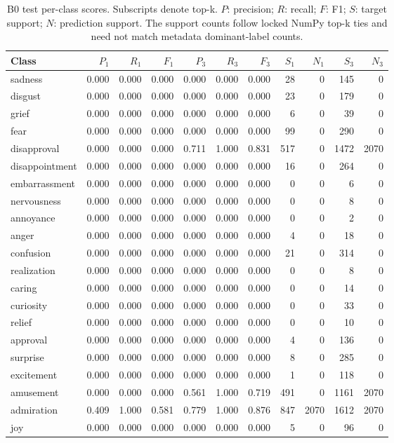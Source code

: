\begin{table}[!htbp]
\centering
\scriptsize
\setlength{\tabcolsep}{5pt}
\begin{tabular}{lrrrrrrrrrr}
\toprule
Class & $P_1$ & $R_1$ & $F_1$ & $P_3$ & $R_3$ & $F_3$ & $S_1$ & $N_1$ & $S_3$ & $N_3$ \\
\midrule
sadness & 0.000 & 0.000 & 0.000 & 0.000 & 0.000 & 0.000 & 28 & 0 & 145 & 0 \\
disgust & 0.000 & 0.000 & 0.000 & 0.000 & 0.000 & 0.000 & 23 & 0 & 179 & 0 \\
grief & 0.000 & 0.000 & 0.000 & 0.000 & 0.000 & 0.000 & 6 & 0 & 39 & 0 \\
fear & 0.000 & 0.000 & 0.000 & 0.000 & 0.000 & 0.000 & 99 & 0 & 290 & 0 \\
disapproval & 0.000 & 0.000 & 0.000 & 0.711 & 1.000 & 0.831 & 517 & 0 & 1472 & 2070 \\
disappointment & 0.000 & 0.000 & 0.000 & 0.000 & 0.000 & 0.000 & 16 & 0 & 264 & 0 \\
embarrassment & 0.000 & 0.000 & 0.000 & 0.000 & 0.000 & 0.000 & 0 & 0 & 6 & 0 \\
nervousness & 0.000 & 0.000 & 0.000 & 0.000 & 0.000 & 0.000 & 0 & 0 & 8 & 0 \\
annoyance & 0.000 & 0.000 & 0.000 & 0.000 & 0.000 & 0.000 & 0 & 0 & 2 & 0 \\
anger & 0.000 & 0.000 & 0.000 & 0.000 & 0.000 & 0.000 & 4 & 0 & 18 & 0 \\
confusion & 0.000 & 0.000 & 0.000 & 0.000 & 0.000 & 0.000 & 21 & 0 & 314 & 0 \\
realization & 0.000 & 0.000 & 0.000 & 0.000 & 0.000 & 0.000 & 0 & 0 & 8 & 0 \\
caring & 0.000 & 0.000 & 0.000 & 0.000 & 0.000 & 0.000 & 0 & 0 & 14 & 0 \\
curiosity & 0.000 & 0.000 & 0.000 & 0.000 & 0.000 & 0.000 & 0 & 0 & 33 & 0 \\
relief & 0.000 & 0.000 & 0.000 & 0.000 & 0.000 & 0.000 & 0 & 0 & 10 & 0 \\
approval & 0.000 & 0.000 & 0.000 & 0.000 & 0.000 & 0.000 & 4 & 0 & 136 & 0 \\
surprise & 0.000 & 0.000 & 0.000 & 0.000 & 0.000 & 0.000 & 8 & 0 & 285 & 0 \\
excitement & 0.000 & 0.000 & 0.000 & 0.000 & 0.000 & 0.000 & 1 & 0 & 118 & 0 \\
amusement & 0.000 & 0.000 & 0.000 & 0.561 & 1.000 & 0.719 & 491 & 0 & 1161 & 2070 \\
admiration & 0.409 & 1.000 & 0.581 & 0.779 & 1.000 & 0.876 & 847 & 2070 & 1612 & 2070 \\
joy & 0.000 & 0.000 & 0.000 & 0.000 & 0.000 & 0.000 & 5 & 0 & 96 & 0 \\
\bottomrule
\end{tabular}
\caption{B0 test per-class scores. Subscripts denote top-k. $P$: precision; $R$: recall; $F$: F1; $S$: target support; $N$: prediction support. The support counts follow locked NumPy top-k ties and need not match metadata dominant-label counts.}
\label{tab:classes-b0_prior}
\end{table}
